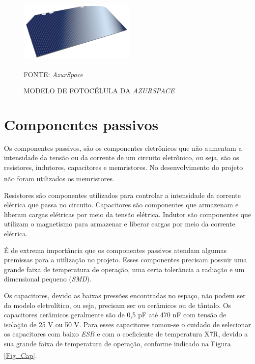\documentclass[
	12pt,				%
	openright,			%
	oneside,			%
	a4paper,			%
	english,			%
	french,				%
	spanish,			%
	brazil,				%
	oldfontcommands
	]{abntex2}
\begin{document}
	\begin{figure}[th]
		\caption{MODELO DE FOTOCÉLULA DA \textit{AZURSPACE}}
		\label{Fig_Cell_Azur}
		\centering
		\includegraphics[width=0.5\linewidth]{./figs/ZTJ}
			
		\begin{small}
			FONTE: \textit{AzurSpace}\textsuperscript{\cite{AzurSpace2}}
		\end{small}		
	\end{figure}

\section[Componentes passivos]{Componentes passivos}\label{Cap_Passivo}

	Os componentes passivos, são os componentes eletrônicos que não aumentam a intensidade da tensão ou da corrente de um circuito eletrônico, ou seja, são os resistores, indutores, capacitores e memristores. No desenvolvimento do projeto não foram utilizados os memristores.\textsuperscript{\cite{Passivo}}
	
	Resistores são componentes utilizados para controlar a intensidade da corrente elétrica que passa no circuito. Capacitores são componentes que armazenam e liberam cargas elétricas por meio da tensão elétrica. Indutor são componentes que utilizam o magnetismo para armazenar e liberar cargas por meio da corrente elétrica.

	É de extrema importância que os componentes passivos atendam algumas premissas para a utilização no projeto. Esses componentes precisam possuir uma grande faixa de temperatura de operação, uma certa tolerância a radiação e um dimensional pequeno (\textit{SMD}).
	
	Os capacitores, devido as baixas pressões encontradas no espaço, não podem ser do modelo eletrolítico, ou seja, precisam ser ou cerâmicos ou de tântalo. Os capacitores cerâmicos geralmente são de 0,5 pF até 470 nF com tensão de isolação de 25 V ou 50 V. Para esses capacitores tomou-se o cuidado de selecionar os capacitores com baixo \textit{ESR} e com o coeficiente de temperatura X7R, devido a sua grande faixa de temperatura de operação, conforme indicado na Figura \ref{Fig_Cap}.\textsuperscript{\cite{x7r}}
	
\end{document}
